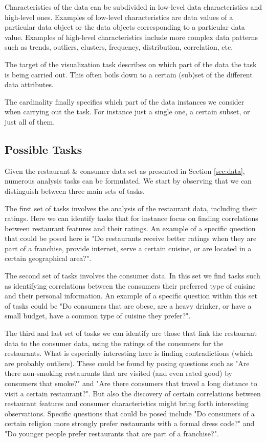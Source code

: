 Characteristics of the data can be subdivided in low-level data characteristics and high-level ones. Examples of low-level characteristics are data values of a particular data object or the data objects corresponding to a particular data value. Examples of high-level characteristics include more complex data patterns such as trends, outliers, clusters, frequency, distribution, correlation, etc.

The target of the visualization task describes on which part of the data the task is being carried out. This often boils down to a certain (sub)set of the different data attributes.

The cardinality finally specifies which part of the data instances we consider when carrying out the task. For instance just a single one, a certain subset, or just all of them.

\subsection{Possible Tasks}
Given the restaurant \& consumer data set as presented in Section \ref{sec:data}, numerous analysis tasks can be formulated. We start by observing that we can distinguish between three main sets of tasks.

The first set of tasks involves the analysis of the restaurant data, including their ratings. Here we can identify tasks that for instance focus on finding correlations between restaurant features and their ratings. An example of a specific question that could be posed here is "Do restaurants receive better ratings when they are part of a franchise, provide internet, serve a certain cuisine, or are located in a certain geographical area?".

The second set of tasks involves the consumer data. In this set we find tasks such as identifying correlations between the consumers their preferred type of cuisine and their personal information. An example of a specific question within this set of tasks could be "Do consumers that are obese, are a heavy drinker, or have a small budget, have a common type of cuisine they prefer?".

The third and last set of tasks we can identify are those that link the restaurant data to the consumer data, using the ratings of the consumers for the restaurants. What is especially interesting here is finding contradictions (which are probably outliers). These could be found by posing questions such as "Are there non-smoking restaurants that are visited (and even rated good) by consumers that smoke?" and "Are there consumers that travel a long distance to visit a certain restaurant?". But also the discovery of certain correlations between restaurant features and consumer characteristics might bring forth interesting observations. Specific questions that could be posed include "Do consumers of a certain religion more strongly prefer restaurants with a formal dress code?" and "Do younger people prefer restaurants that are part of a franchise?".



